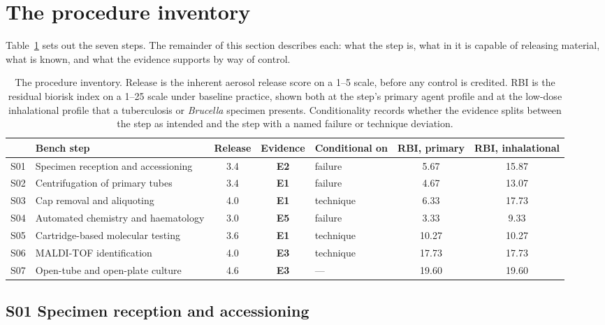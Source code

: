 \section{The procedure inventory}
\label{sec:inventory}

Table~\ref{tab:inventory} sets out the seven steps. The remainder of this
section describes each: what the step is, what in it is capable of releasing
material, what is known, and what the evidence supports by way of control.

\begin{table}[t]
\centering
\caption{The procedure inventory. Release is the inherent aerosol release score
on a 1--5 scale, before any control is credited. RBI is the residual biorisk
index on a 1--25 scale under baseline practice, shown both at the step's
primary agent profile and at the low-dose inhalational profile that a
tuberculosis or \textit{Brucella} specimen presents. Conditionality records
whether the evidence splits between the step as intended and the step with a
named failure or technique deviation.}
\label{tab:inventory}
\small
\begin{tabular}{@{}llccl cc@{}}
\toprule
 & \textbf{Bench step} & \textbf{Release} & \textbf{Evidence} &
 \textbf{Conditional on} & \textbf{RBI, primary} & \textbf{RBI, inhalational} \\
\midrule
S01 & Specimen reception and accessioning & 3.4 & \textbf{E2} & failure    & 5.67 & 15.87 \\
S02 & Centrifugation of primary tubes     & 3.4 & \textbf{E1} & failure    & 4.67 & 13.07 \\
S03 & Cap removal and aliquoting          & 4.0 & \textbf{E1} & technique  & 6.33 & 17.73 \\
S04 & Automated chemistry and haematology & 3.0 & \textbf{E5} & failure    & 3.33 & \phantom{0}9.33 \\
S05 & Cartridge-based molecular testing   & 3.6 & \textbf{E1} & technique  & 10.27 & 10.27 \\
S06 & MALDI-TOF identification            & 4.0 & \textbf{E3} & technique  & 17.73 & 17.73 \\
S07 & Open-tube and open-plate culture    & 4.6 & \textbf{E3} & ---        & 19.60 & 19.60 \\
\bottomrule
\end{tabular}
\end{table}

\subsection{S01 Specimen reception and accessioning}

